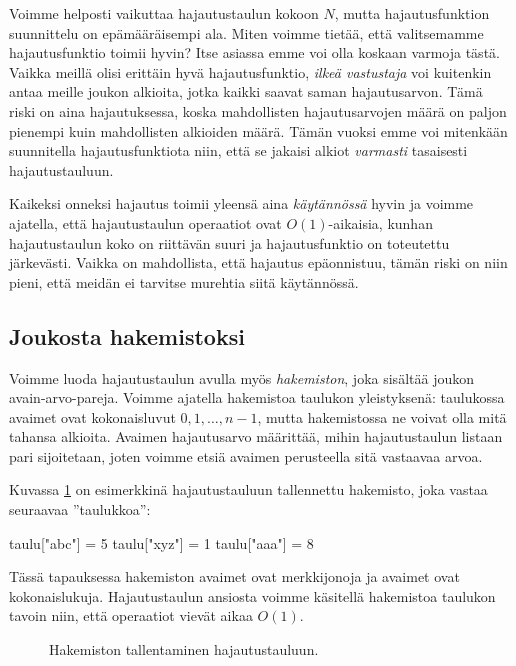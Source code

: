 Voimme helposti vaikuttaa hajautustaulun kokoon $N$,
mutta hajautusfunktion suunnittelu on epämääräisempi ala.
Miten voimme tietää, että valitsemamme hajautusfunktio
toimii hyvin?
Itse asiassa emme voi olla koskaan varmoja tästä.
Vaikka meillä olisi erittäin hyvä hajautusfunktio,
\emph{ilkeä vastustaja} voi kuitenkin antaa
meille joukon alkioita, jotka kaikki saavat saman hajautusarvon.
Tämä riski on aina hajautuksessa, koska mahdollisten
hajautusarvojen määrä on paljon pienempi kuin mahdollisten alkioiden määrä.
Tämän vuoksi emme voi mitenkään suunnitella hajautusfunktiota niin,
että se jakaisi alkiot \emph{varmasti} tasaisesti hajautustauluun.

Kaikeksi onneksi hajautus toimii yleensä aina \emph{käytännössä}
hyvin ja voimme ajatella, että hajautustaulun operaatiot ovat
$O(1)$-aikaisia, kunhan hajautustaulun koko on riittävän suuri ja
hajautusfunktio on toteutettu järke\-västi.
Vaikka on mahdollista, että hajautus epäonnistuu,
tämän riski on niin pieni, että meidän ei tarvitse murehtia
siitä käytännössä.

\subsection{Joukosta hakemistoksi}

Voimme luoda hajautustaulun avulla myös
\emph{hakemiston}, joka sisältää joukon avain-arvo-pareja.
Voimme ajatella hakemistoa taulukon yleistyksenä:
taulukossa avaimet ovat kokonaisluvut $0,1,\dots,n-1$,
mutta hakemistossa ne voivat olla mitä tahansa alkioita.
Avaimen hajautusarvo määrittää, mihin hajautustaulun
listaan pari sijoitetaan, joten voimme etsiä avaimen
perusteella sitä vastaavaa arvoa.

Kuvassa \ref{fig:hajhak} on esimerkkinä hajautustauluun
tallennettu hakemisto, joka vastaa seuraavaa ''taulukkoa'':

\begin{code}
taulu["abc"] = 5
taulu["xyz"] = 1
taulu["aaa"] = 8
\end{code}

Tässä tapauksessa hakemiston avaimet ovat merkkijonoja
ja avaimet ovat kokonaislukuja.
Hajautustaulun ansiosta voimme käsitellä hakemistoa
taulukon tavoin niin, että operaatiot vievät aikaa $O(1)$.

\begin{figure}
\center
{}
\caption{Hakemiston tallentaminen hajautustauluun.}
\label{fig:hajhak}
\end{figure}

